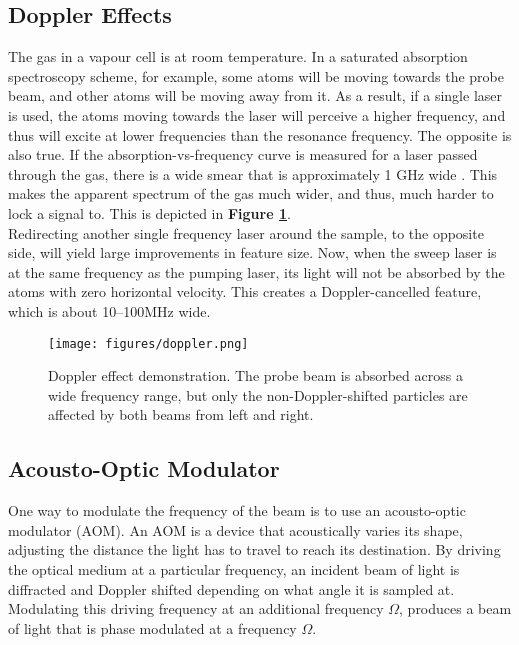 \subsection{Doppler Effects}

The gas in a vapour cell is at room temperature. In a saturated absorption spectroscopy scheme, for example, some atoms will be moving towards the probe beam, and other atoms will be moving away from it. As a result, if a single laser is used, the atoms moving towards the laser will perceive a higher frequency, and thus will excite at lower frequencies than the resonance frequency.  The opposite is also true.  If the absorption-vs-frequency curve is measured for a laser passed through the gas, there is a wide smear that is approximately 1 GHz wide \cite{madison14}.  This makes the apparent spectrum of the gas much wider, and thus, much harder to lock a signal to. This is depicted in \textbf{Figure \ref{fig:doppler}}. \\

Redirecting another single frequency laser around the sample, to the opposite side, will yield large improvements in feature size.  Now, when the sweep laser is at the same frequency as the pumping laser, its light will not be absorbed by the atoms with zero horizontal velocity.  This creates a Doppler-cancelled feature, which is about 10--100MHz wide.

\begin{figure}[H]
    \centering
    \texttt{[image: figures/doppler.png]}
    \caption[Doppler effect demonstration]{Doppler effect demonstration.  The probe beam is absorbed across a wide frequency range, but only the non-Doppler-shifted particles are affected by both beams from left and right.}
    \label{fig:doppler}
\end{figure}

\subsection{Acousto-Optic Modulator}

One way to modulate the frequency of the beam is to use an acousto-optic modulator (AOM). An AOM is a device that acoustically varies its shape, adjusting the distance the light has to travel to reach its destination.  By driving the optical medium at a particular frequency, an incident beam of light is diffracted and Doppler shifted depending on what angle it is sampled at. Modulating this driving frequency at an additional frequency $\Omega$, produces a beam of light that is phase modulated at a frequency $\Omega$. \\

